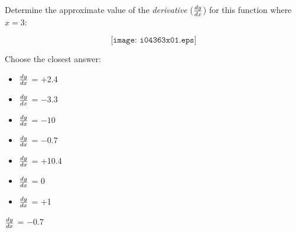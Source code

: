 

Determine the approximate value of the {\it derivative} ($dy \over dx$) for this function where $x=3$:

$$\texttt{[image: i04363x01.eps]}$$

Choose the closest answer:

\begin{itemize}
\item{} $dy \over dx$ = +2.4
\vskip 10pt 
\item{} $dy \over dx$ = $-3.3$
\vskip 10pt 
\item{} $dy \over dx$ = $-10$
\vskip 10pt 
\item{} $dy \over dx$ = $-0.7$
\vskip 10pt 
\item{} $dy \over dx$ = +10.4 
\vskip 10pt 
\item{} $dy \over dx$ = 0
\vskip 10pt 
\item{} $dy \over dx$ = +1
\end{itemize}







$dy \over dx$ = $-0.7$











